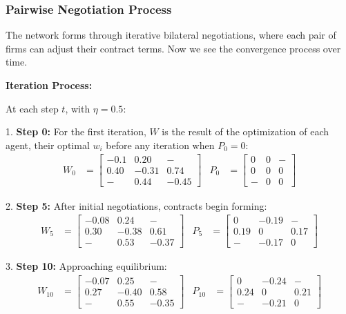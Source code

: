 \subsubsection{Pairwise Negotiation Process}

The network forms through iterative bilateral negotiations, where each pair of firms can adjust their contract terms. Now we see the convergence process over time.

\textbf{Iteration Process:}

At each step $t$, with $\eta = 0.5$:

1. \textbf{Step 0:} For the first iteration, $W$ is the result of the optimization of each agent, their optimal $w_i$ before any iteration when $P_0=0$:
   \begin{align}
       W_0 &= \begin{bmatrix} 
           -0.1 & 0.20 & - \\ 
           0.40 & -0.31 & 0.74 \\ 
           - & 0.44 & -0.45 
       \end{bmatrix} &
       P_0 &= \begin{bmatrix} 
           0 & 0 & - \\ 
           0 & 0 & 0 \\ 
           - & 0 & 0 
       \end{bmatrix}
   \end{align}

2. \textbf{Step 5:} After initial negotiations, contracts begin forming:
   \begin{align}
       W_5 &= \begin{bmatrix} 
           -0.08 & 0.24 & - \\ 
           0.30 & -0.38 & 0.61 \\ 
           - & 0.53 & -0.37 
       \end{bmatrix} &
       P_5 &= \begin{bmatrix} 
           0 & -0.19 & - \\ 
           0.19 & 0 & 0.17 \\ 
           - & -0.17 & 0 
       \end{bmatrix}
   \end{align}

3. \textbf{Step 10:} Approaching equilibrium:
   \begin{align}
       W_{10} &= \begin{bmatrix} 
           -0.07 & 0.25 & - \\ 
           0.27 & -0.40 & 0.58 \\ 
           - & 0.55 & -0.35 
       \end{bmatrix} &
       P_{10} &= \begin{bmatrix} 
           0 & -0.24 & - \\ 
           0.24 & 0 & 0.21 \\ 
           - & -0.21 & 0 
       \end{bmatrix}
   \end{align}

